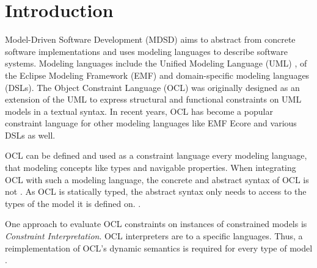 \section{Introduction}

	Model-Driven Software Development (MDSD) aims to abstract from concrete 
	software implementations and uses modeling languages to describe 
	software systems. Modeling languages include the Unified Modeling Language 
	(UML) \cite{spec:UML2-2},  of the
	Eclipse Modeling Framework (EMF) \cite{WWW:EMF} and domain-specific modeling languages (DSLs). The Object 
	Constraint Language (OCL) \cite{spec:OCL2-2} was originally designed as 
	an extension of the UML to express structural and functional constraints 
	on UML models in a textual syntax. In recent years, OCL has become a 
	popular constraint language for other modeling languages like EMF Ecore 
	and various DSLs as well. 

	OCL can be
	defined and used as a constraint language  every modeling language, that  modeling concepts like types and navigable properties.
	When integrating OCL with such a modeling language, the concrete and 
	abstract syntax of OCL is not . As OCL is statically
	typed, the abstract syntax only needs to access to the types of the model 
	it is defined on. \cite{braeuerOCL07}.

	One approach to evaluate 
	OCL constraints on instances 
	of constrained models is \textit{Constraint Interpretation}. 
	OCL interpreters are  to a specific
	 languages. Thus, a
	reimplementation of OCL's dynamic semantics is required for every type of 
	model . 

